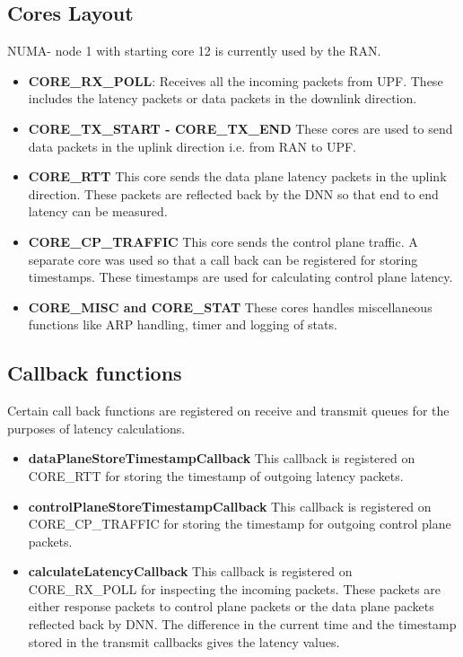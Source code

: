\documentclass{article}
\begin{document}
\subsection{Cores Layout}
NUMA- node 1 with starting core 12 is currently used by the RAN.
\begin{itemize}
    \item \textbf{CORE\_RX\_POLL}: Receives all the incoming packets from UPF. These includes the latency packets or data packets in the downlink direction.
    \item \textbf{CORE\_TX\_START - CORE\_TX\_END}
          These cores are used to send data packets in the uplink  direction i.e. from RAN to UPF.
    \item \textbf{CORE\_RTT}
          This core sends the data plane latency packets in the uplink direction. These packets are reflected back by the DNN so that end to end latency can be measured.
    \item \textbf{CORE\_CP\_TRAFFIC} This core sends the control plane traffic. A separate core was used so that a call back can be registered for storing timestamps. These timestamps are used for calculating control plane latency.
    \item \textbf{CORE\_MISC and CORE\_STAT}
          These cores handles miscellaneous functions like ARP handling, timer and logging of stats.
\end{itemize}
\subsection{Callback functions}
Certain call back functions are registered on receive and transmit queues for the purposes of latency calculations.
\begin{itemize}
    \item \textbf{dataPlaneStoreTimestampCallback}
          This callback is registered on CORE\_RTT for storing the timestamp of outgoing latency packets.
    \item \textbf{controlPlaneStoreTimestampCallback} This callback is registered on CORE\_CP\_TRAFFIC for storing the timestamp for outgoing control plane packets.
    \item \textbf{calculateLatencyCallback} This callback is registered on CORE\_RX\_POLL for inspecting the incoming packets.
          These packets are either response packets to control plane packets or the data plane packets reflected back by DNN. The difference in the current time and the timestamp stored in the transmit callbacks gives the latency values.
\end{itemize}
\end{document}
